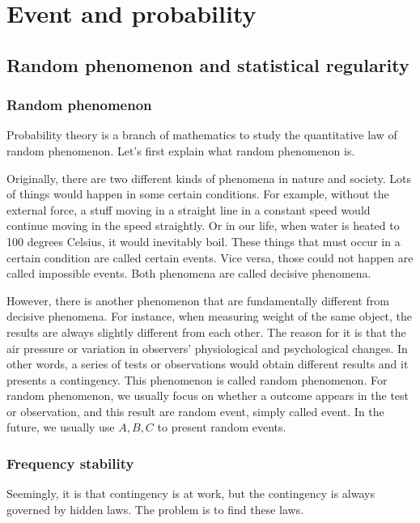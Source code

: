 \section{Event and probability}

\subsection{Random phenomenon and statistical regularity}

\subsubsection{Random phenomenon}

Probability theory is a branch of mathematics to study the quantitative law of random phenomenon. Let's first explain what random phenomenon is.

Originally, there are two different kinds of phenomena in nature and society. Lots of things would happen in some certain conditions. For example, without the external force, a stuff moving in a straight line in a constant speed would continue moving in the speed straightly. Or in our life, when water is heated to 100 degrees Celsius, it would inevitably boil. These things that must occur in a certain condition are called certain events. Vice versa, those could not happen are called impossible events. Both phenomena are called decisive phenomena.

However, there is another phenomenon that are fundamentally different from decisive phenomena. For instance, when measuring weight of the same object, the results are always slightly different from each other. The reason for it is that the air pressure or variation in observers' physiological and psychological changes. In other words, a series of tests or observations would obtain different results and it presents a contingency. This phenomenon is called random phenomenon. For random phenomenon, we usually focus on whether a outcome appears in the test or observation, and this result are random event, simply called event. In the future, we usually use $A,B,C$ to present random events.

\subsubsection{Frequency stability}

Seemingly, it is that contingency is at work, but the contingency is always governed by hidden laws. The problem is to find these laws.

